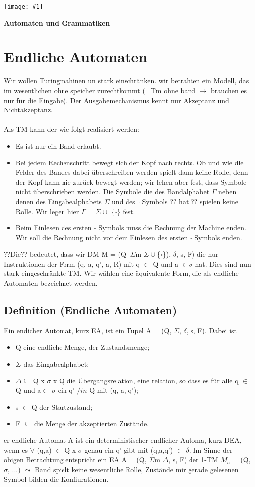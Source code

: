 \documentclass[a4paper,11pt]{article}
\newcommand{\coversection}[2]{
  \newpage
  \thispagestyle{empty}
  \begin{center}
    \vspace*{\fill}
    \texttt{[image: \#1]}
    \vspace*{0.5cm} %
    \par
    \Large\textbf{#2}
    \par\vspace{\fill}
  \end{center}
  \newpage
}
\begin{document}
\coversection{finit1.png}{Automaten und Grammatiken}
\section{Endliche Automaten}
Wir wollen Turingmahinen un stark einschränken. 
wir betrahten ein Modell, das im wesentlichen ohne speicher
zurechtkommt (=Tm ohne band $\longrightarrow$  brauchen es nur für die Eingabe).
Der Ausgabemechanismus kennt nur Akzeptanz und Nichtakzeptanz.\\\\
Als TM kann der wie folgt realisiert werden:
\begin{itemize}
    \item Es ist nur ein Band erlaubt.
    \item Bei jedem Rechenschritt bewegt sich der Kopf nach rechts. Ob und wie die Felder des Bandes dabei überschreiben werden spielt dann keine Rolle, denn der Kopf kann nie zurück bewegt werden; wir lehen aber fest, dass Symbole nicht überschrieben werden. Die Symbole die des Bandalphabet $\Gamma $ neben denen des Eingabealphabets $\Sigma $ und des $\square $  Symbols ?? hat ?? spielen keine Rolle. Wir legen hier $\varGamma $ = $\Sigma \cup $ \{$\square $\} fest.
    \item Beim Einlesen des ersten $\square $ Symbols muss die Rechnung der Machine enden. Wir soll die Rechnung nicht vor dem Einlesen des ersten $\square $ Symbols enden. 
\end{itemize}
??Die?? bedeutet, dass wir DM M = (Q, $\Sigma$m $\Sigma\cup $\{$\square $\}), $\delta$, s, F) die nur Instruktionen der Form (q, a, q', a, R) mit q $\in$ Q und a $\in \sigma$ hat.
Dies sind nun stark eingeschränkte TM. Wir wählen eine äquivalente Form, die als endliche Automaten bezeichnet werden. 

\subsection{Definition (Endliche Automaten)}
Ein endicher Automat, kurz EA, ist ein Tupel A = (Q, $\Sigma$, $\delta$, s, F). Dabei ist 
\begin{itemize}
    \item Q eine endliche Menge, der Zustandsmenge;
    \item $\Sigma$ das Eingabealphabet;
    \item $\Delta \subseteq$ Q x $\sigma$ x Q die Übergangsrelation, eine relation, so dass es für alle q $\in$ Q und a$\in$ $\sigma$ ein q' $/in$ Q mit (q, a, q');
    \item s $\in$ Q der Startzustand;
    \item F $\subseteq$ die Menge der akzeptierten Zustände.
\end{itemize}
er endliche Automat A ist ein deterministischer endlicher Automa,
kurz DEA, wenn es $\forall$ (q,a) $\in$ Q x $\sigma$ genau ein q' gibt mit (q,a,q') $\in$ $\delta$. 
Im Sinne der obigen Betrachtung entspricht ein EA A = (Q, $\Sigma$m $\Delta$, s, F) der 1-TM $M_{a}$ = (Q, $\sigma$, ...)
$\leadsto $ Band spielt keine wesentliche Rolle, Zustände mir gerade gelesenen Symbol bilden die Konfiurationen.
\end{document}
